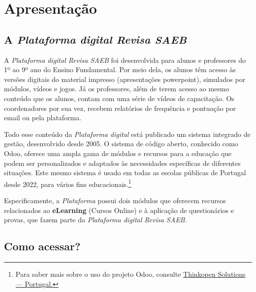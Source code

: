 \captionsetup{justification=raggedright, singlelinecheck=false}

\chapter{Apresentação}

\section{A \textit{Plataforma digital Revisa SAEB}}


A \textit{Plataforma digital Revisa SAEB} foi desenvolvida para alunos e
professores do 1º ao 9º ano do Ensino Fundamental. Por meio dela, os alunos
têm acesso às versões digitais do material impresso (apresentações powerpoint), simulados 
por módulos, vídeos e jogos. Já os professores, além de terem acesso ao
mesmo conteúdo que os alunos, contam com uma série de vídeos de capacitação.
Os coordenadores por sua vez, recebem relatórios de frequência e pontuação por
email ou pela plataforma.

Todo esse conteúdo da \textit{Plataforma digital} está publicado  um
sistema integrado de gestão, desenvolvido desde
2005. O sistema de código aberto, conhecido como Odoo, oferece uma ampla gama de módulos e
recursos para a educação que podem ser personalizados e adaptados às
necessidades específicas de diferentes situações. Este mesmo sistema é usado
em todas as escolas públicas de Portugal desde 2022, para vários fins
educacionais.\footnote{ Para saber mais sobre o uso do projeto Odoo, consulte 
\href{https://www.odoo.com/pt_BR/partners/thinkopen-solutions-portugal-2614}{Thinkopen Solutions — Portugal.}}


Especificamente, a \textit{Plataforma} possui dois módulos que oferecem 
recursos relacionados ao \textbf{eLearning} (Cursos Online) e 
à aplicação de questionários e provas, que fazem parte da \textit{Plataforma digital Revisa SAEB}.  




\section{Como acessar?} 

